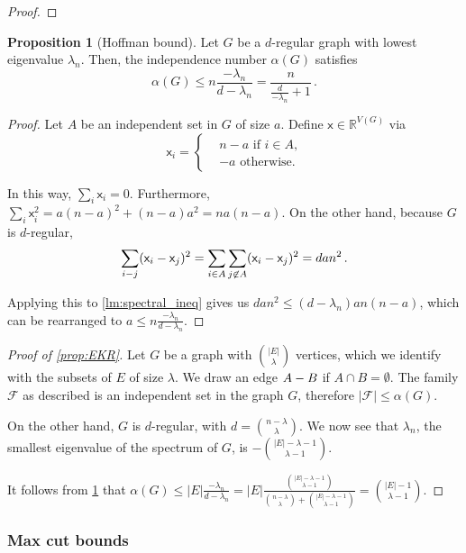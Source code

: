 \documentclass[12pt]{amsart}
\theoremstyle{definition}
\newtheorem{prop}[thm]{Proposition}
\newcommand{\R}{\mathbb{R}}
\newcommand{\FF}{\mathcal F}
\newcommand{\vx}{\mathsf{x}}
\begin{document}
\begin{proof}

\end{proof}

\begin{prop}[Hoffman bound]\label{prop:indep_bound}
Let $G$ be a $d$-regular graph with lowest eigenvalue $\lambda_n$.
Then, the independence number $\alpha(G)$ satisfies
$$\alpha(G) \leq n \frac{-\lambda_n}{d - \lambda_n} = \frac{n}{\frac{d}{-\lambda_n} + 1}\, . $$
\end{prop}

\begin{proof}
Let $A$ be an independent set in $G$ of size $a$.
Define $\vx \in \R^{V(G)}$ via 
$$ \vx_i =\begin{cases*}
      & n-a \text{ if $i \in A$,}\\
      & -a \text{ otherwise.}
    \end{cases*} $$

In this way, $\sum_i \vx_i  = 0$.
Furthermore, $\sum_i \vx_i^2 = a(n-a)^2 + (n-a)a^2 = n a (n-a)$.
On the other hand, because $G$ is $d$-regular,
$$ \sum_{i \-- j} (\vx_i - \vx_j)^2 = \sum_{i \in A}\sum_{j \not\in A}(\vx_i - \vx_j)^2 = dan^2\, . $$

Applying this to \cref{lm:spectral_ineq} gives us $dan^2 \leq (d-\lambda_n)an (n-a)$, which can be rearranged to $a \leq n \frac{-\lambda_n}{d - \lambda_n}$.
\end{proof}

\begin{proof}[Proof of \cref{prop:EKR}]
Let $G$ be a graph with $\binom{|E|}{\lambda}$ vertices, which we identify with the subsets of $E$ of size $\lambda$.
We draw an edge $A \-- B$ if $A \cap B = \emptyset $.
The family $\FF $ as described is an independent set in the graph $G$, therefore $|\FF | \leq \alpha (G)$.

On the other hand, $G$ is $d$-regular, with $d = \binom{n - \lambda}{ \lambda}$.
We now see that $\lambda_n$, the smallest eigenvalue of the spectrum of $G$, is $-\binom{|E| - \lambda - 1}{\lambda - 1}$.

It follows from \cref{prop:indep_bound} that $\alpha(G) \leq |E|\frac{-\lambda_n}{d - \lambda_n} = |E|\frac{\binom{|E| - \lambda - 1}{\lambda - 1}}{\binom{n - \lambda}{\lambda} + \binom{|E| - \lambda - 1}{\lambda - 1}} = \binom{|E|-1}{\lambda - 1}$.
\end{proof}

\subsubsection*{Max cut bounds}
\end{document}
